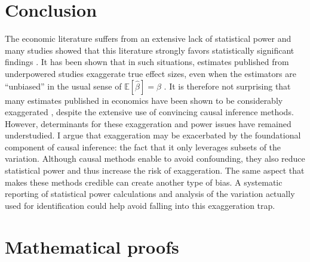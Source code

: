 \documentclass[usletter, 12pt]{article}
\begin{document}



\section{Conclusion} \label{conclusion}

	The economic literature suffers from an extensive lack of statistical power \citep{ioannidis_power_2017} and many studies showed that this literature strongly favors statistically significant findings \citep[for instance]{rosenthal_file_1979, andrews_identification_2019, abadie_statistical_2020, brodeur_methods_2020}. It has been shown that in such situations, estimates published from underpowered studies exaggerate true effect sizes, even when the estimators are ``unbiased'' in the usual sense of $\mathbb{E}[\hat{\beta}] = \beta$ \citep{ioannidis_why_2008, gelman_beyond_2014, lu_note_2019, zwet_significance_2021}. It is therefore not surprising that many estimates published in economics have been shown to be considerably exaggerated  \citep{camerer_evaluating_2016, ioannidis_power_2017}, despite the extensive use of convincing causal inference methods.  However, determinants for these exaggeration and power issues have remained understudied. I argue that exaggeration may be exacerbated by the foundational component of causal inference: the fact that it only leverages subsets of the variation. Although causal methods enable to avoid confounding, they also reduce statistical power and thus increase the risk of exaggeration. The same aspect that makes these methods credible can create another type of bias. A systematic reporting of statistical power calculations and analysis of the variation actually used for identification could help avoid falling into this exaggeration trap.
	
		
	
\newpage
	



\newpage

\appendix

	\section{Mathematical proofs}\label{maths_proofs}
	
\end{document}
